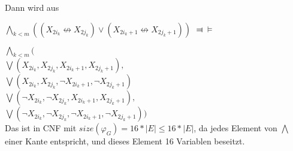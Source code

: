 Dann wird aus 
 
 $\bigwedge_{k<m}( (X_{2i_k} \not \leftrightarrow X_{2j_k}  ) \vee (X_{2i_k +1} \not \leftrightarrow X_{2j_k +1} ) ) $
 $\Dashv \vDash$
 
$\bigwedge_{k<m} ($ \\
$ \bigvee ( X_{2i_k}, X_{2j_k},  X_{2i_k +1}, X_{2j_k +1}),$\\
$ \bigvee ( X_{2i_k}, X_{2j_k}, \neg X_{2i_k +1} ,  \neg X_{2j_k +1} )$\\
$  \bigvee ( \neg X_{2i_k} ,  \neg X_{2j_k},  X_{2i_k +1}, X_{2j_k +1}),$\\
$ \bigvee ( \neg X_{2i_k} ,  \neg X_{2j_k}, \neg X_{2i_k +1} ,  \neg X_{2j_k +1} ))$ \\
Das ist in CNF mit $size(\varphi_G) =16 * |E| \leq 16* |E|$, da jedes Element von $\bigwedge$ einer Kante entspricht, und dieses  Element 16 Variablen beseitzt.
  
